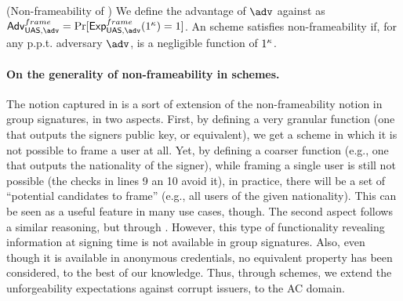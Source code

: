 \begin{definition}{(Non-frameability of \UAS)}
  \label{def:frame-uas}
  We define the advantage \AdvNonframe of $\adv$ against \ExpNonframe as
  $\AdvNonframe=\Pr\lbrack\ExpNonframe(1^\secpar)=1\rbrack$.
  An \UAS scheme satisfies non-frameability if, for any p.p.t. adversary $\adv$,
  \AdvNonframe is a negligible function of $1^\kappa$.
\end{definition}

\paragraph{On the generality of non-frameability in \UAS schemes.} %
The notion captured in \UAS is a sort of extension of the non-frameability
notion in group signatures, in two aspects. First, by defining a very granular
\finsp function (one that outputs the signers public key, or equivalent),
we get a scheme in which it is not possible to frame a user at all. Yet, by
defining a coarser \finsp function (e.g., one that outputs the nationality of
the signer), while framing a single user is still not possible (the checks in
lines 9 an 10 avoid it), in practice, there will be a set of ``potential
candidates to frame'' (e.g., all users of the given nationality). This can be
seen as a useful feature in many use cases, though.
%
The second aspect follows a similar reasoning, but through \feval. However, this
type of functionality revealing information at signing time is not available in
group signatures. Also, even though it is available in anonymous credentials, no
equivalent property has been considered, to the best of our knowledge. Thus,
through \UAS schemes, we extend the unforgeability expectations against corrupt
issuers, to the AC domain.


